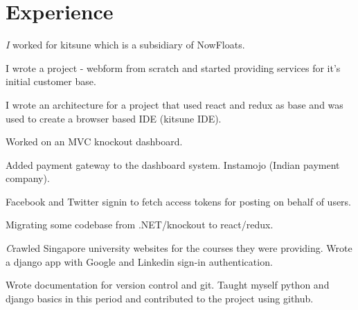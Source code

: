 \documentclass[]{deedy-resume-openfont}
\begin{document}
\begin{minipage}[t]{0.66\textwidth}


\section{Experience}


\vspace{\topsep} %
\begin{tightemize}
\item \emph I worked for kitsune which is a subsidiary of NowFloats.
\item I wrote a project - webform from scratch and started providing services for it's initial customer base.
\item I wrote an architecture for a project that used react and redux as base and was used to create a browser based IDE (kitsune IDE).
\end{tightemize}
\sectionsep


\begin{tightemize}
\item Worked on an MVC knockout dashboard.
\item Added payment gateway to the dashboard system. Instamojo (Indian payment company).
\item Facebook and Twitter signin to fetch access tokens for posting on behalf of users.
\item Migrating some codebase from .NET/knockout to react/redux.
\vspace{\topsep} %
\end{tightemize}

\begin{tightemize}
\item \emph Crawled Singapore university websites for the courses they were providing. Wrote a django app with Google and Linkedin sign-in authentication. \end{tightemize}
\sectionsep

\vspace{\topsep} %
\begin{tightemize}
\item Wrote documentation for version control and git. Taught myself python and django basics in this period and contributed to the project using github.\end{tightemize}
\sectionsep


\end{minipage}
\end{document}
